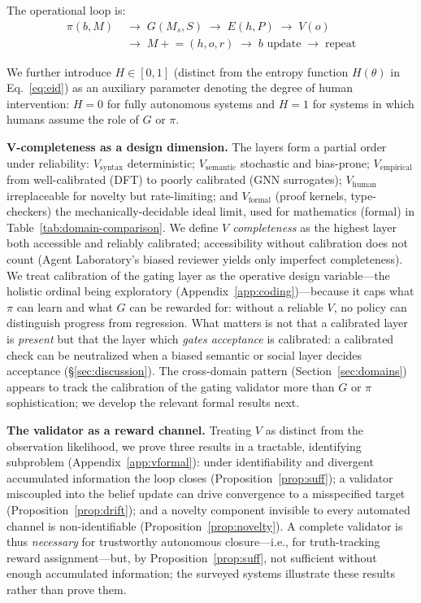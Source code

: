 \documentclass{article}
\begin{document}
\noindent The operational loop is:
\begin{align}
  \pi(b, M) &\;\rightarrow\; G(M_s, S) \;\rightarrow\; E(h, P) \;\rightarrow\; V(o) \nonumber\\
            &\;\rightarrow\; M \mathrel{+}= (h, o, r) \;\rightarrow\; b \text{ update} \;\rightarrow\; \text{repeat}
\end{align}

We further introduce $H \in [0,1]$ (distinct from the entropy function $H(\theta)$ in Eq.~\ref{eq:eid}) as an auxiliary parameter denoting the degree of human intervention: $H=0$ for fully autonomous systems and $H=1$ for systems in which humans assume the role of $G$ or $\pi$.

\noindent\textbf{V-completeness as a design dimension.} The layers form a partial order under reliability: $V_\text{syntax}$ deterministic; $V_\text{semantic}$ stochastic and bias-prone; $V_\text{empirical}$ from well-calibrated (DFT) to poorly calibrated (GNN surrogates); $V_\text{human}$ irreplaceable for novelty but rate-limiting; and $V_\text{formal}$ (proof kernels, type-checkers) the mechanically-decidable ideal limit, used for mathematics (formal) in Table~\ref{tab:domain-comparison}. We define \emph{$V$ completeness} as the highest layer both accessible and reliably calibrated; accessibility without calibration does not count (Agent Laboratory's biased reviewer yields only imperfect completeness). We treat calibration of the gating layer as the operative design variable---the holistic ordinal being exploratory (Appendix~\ref{app:coding})---because it caps what $\pi$ can learn and what $G$ can be rewarded for: without a reliable $V$, no policy can distinguish progress from regression. What matters is not that a calibrated layer is \emph{present} but that the layer which \emph{gates acceptance} is calibrated: a calibrated check can be neutralized when a biased semantic or social layer decides acceptance (\S\ref{sec:discussion}). The cross-domain pattern (Section~\ref{sec:domains}) appears to track the calibration of the gating validator more than $G$ or $\pi$ sophistication; we develop the relevant formal results next.

\noindent\textbf{The validator as a reward channel.} Treating $V$ as distinct from the observation likelihood, we prove three results in a tractable, identifying subproblem (Appendix~\ref{app:vformal}): under identifiability and divergent accumulated information the loop closes (Proposition~\ref{prop:suff}); a validator miscoupled into the belief update can drive convergence to a misspecified target (Proposition~\ref{prop:drift}); and a novelty component invisible to every automated channel is non-identifiable (Proposition~\ref{prop:novelty}). A complete validator is thus \emph{necessary} for trustworthy autonomous closure---i.e., for truth-tracking reward assignment---but, by Proposition~\ref{prop:suff}, not sufficient without enough accumulated information; the surveyed systems illustrate these results rather than prove them.
\end{document}
